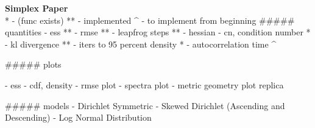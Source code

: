 \noindent \textbf{\Huge Simplex Paper}\\[0.3cm]


* - (func exists)
** - implemented
^ - to implement from beginning
##### quantities
- ess **
- rmse **
- leapfrog steps **
- hessian - cn, condition number *
- kl divergence **
- iters to 95 percent density *
- autocorrelation time ^

##### plots

- ess - cdf, density
- rmse plot
- spectra plot
- metric geometry plot replica

##### models
- Dirichlet Symmetric
- Skewed Dirichlet (Ascending and Descending)
- Log Normal Distribution
